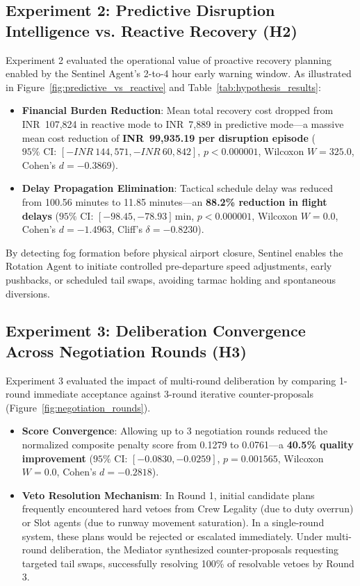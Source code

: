 \subsection{Experiment 2: Predictive Disruption Intelligence vs. Reactive Recovery (H2)}
Experiment 2 evaluated the operational value of proactive recovery planning enabled by the Sentinel Agent's 2-to-4 hour early warning window. As illustrated in Figure~\ref{fig:predictive_vs_reactive} and Table~\ref{tab:hypothesis_results}:
\begin{itemize}
    \item \textbf{Financial Burden Reduction}: Mean total recovery cost dropped from INR~107,824 in reactive mode to INR~7,889 in predictive mode---a massive mean cost reduction of \textbf{INR~99,935.19 per disruption episode} ($95\%\text{ CI: } [-INR~144,571, -INR~60,842]$, $p < 0.000001$, Wilcoxon $W = 325.0$, Cohen's $d = -0.3869$).
    \item \textbf{Delay Propagation Elimination}: Tactical schedule delay was reduced from 100.56 minutes to 11.85 minutes---an \textbf{88.2\% reduction in flight delays} ($95\%\text{ CI: } [-98.45, -78.93]\,\text{min}$, $p < 0.000001$, Wilcoxon $W = 0.0$, Cohen's $d = -1.4963$, Cliff's $\delta = -0.8230$).
\end{itemize}
By detecting fog formation before physical airport closure, Sentinel enables the Rotation Agent to initiate controlled pre-departure speed adjustments, early pushbacks, or scheduled tail swaps, avoiding tarmac holding and spontaneous diversions.

\subsection{Experiment 3: Deliberation Convergence Across Negotiation Rounds (H3)}
Experiment 3 evaluated the impact of multi-round deliberation by comparing 1-round immediate acceptance against 3-round iterative counter-proposals (Figure~\ref{fig:negotiation_rounds}).
\begin{itemize}
    \item \textbf{Score Convergence}: Allowing up to 3 negotiation rounds reduced the normalized composite penalty score from 0.1279 to 0.0761---a \textbf{40.5\% quality improvement} ($95\%\text{ CI: } [-0.0830, -0.0259]$, $p = 0.001565$, Wilcoxon $W = 0.0$, Cohen's $d = -0.2818$).
    \item \textbf{Veto Resolution Mechanism}: In Round 1, initial candidate plans frequently encountered hard vetoes from Crew Legality (due to duty overrun) or Slot agents (due to runway movement saturation). In a single-round system, these plans would be rejected or escalated immediately. Under multi-round deliberation, the Mediator synthesized counter-proposals requesting targeted tail swaps, successfully resolving 100\% of resolvable vetoes by Round 3.
\end{itemize}

